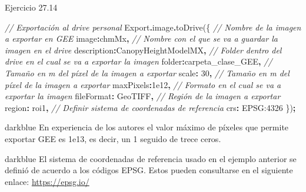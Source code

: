 \documentclass[
  12pt,
  letterpaper,
  twoside]{book}
\newenvironment{Shaded}{\begin{snugshade}}{\end{snugshade}}
\newcommand{\AttributeTok}[1]{\textcolor[rgb]{0.77,0.63,0.00}{#1}}
\newcommand{\CommentTok}[1]{\textcolor[rgb]{0.56,0.35,0.01}{\textit{#1}}}
\newcommand{\DataTypeTok}[1]{\textcolor[rgb]{0.13,0.29,0.53}{#1}}
\newcommand{\DecValTok}[1]{\textcolor[rgb]{0.00,0.00,0.81}{#1}}
\newcommand{\FloatTok}[1]{\textcolor[rgb]{0.00,0.00,0.81}{#1}}
\newcommand{\FunctionTok}[1]{\textcolor[rgb]{0.00,0.00,0.00}{#1}}
\newcommand{\NormalTok}[1]{#1}
\newcommand{\OperatorTok}[1]{\textcolor[rgb]{0.81,0.36,0.00}{\textbf{#1}}}
\newcommand{\StringTok}[1]{\textcolor[rgb]{0.31,0.60,0.02}{#1}}
\begin{document}
Ejercicio 27.14

\begin{Shaded}
\begin{Highlighting}[]
\CommentTok{// Exportación al drive personal}
\NormalTok{Export}\OperatorTok{.}\AttributeTok{image}\OperatorTok{.}\FunctionTok{toDrive}\NormalTok{(\{}
  \CommentTok{// Nombre de la imagen a exportar en GEE}
  \DataTypeTok{image}\OperatorTok{:}\NormalTok{chmMx}\OperatorTok{,} 
  \CommentTok{// Nombre con el que se va a guardar la imagen en el drive}
  \DataTypeTok{description}\OperatorTok{:}\StringTok{\textquotesingle{}CanopyHeightModelMX\textquotesingle{}}\OperatorTok{,}
  \CommentTok{// Folder dentro del drive en el cual se va a exportar la imagen}
  \DataTypeTok{folder}\OperatorTok{:}\StringTok{\textquotesingle{}carpeta\_clase\_GEE\textquotesingle{}}\OperatorTok{,}
  \CommentTok{// Tamaño en m del píxel de la imagen a exportar}
  \DataTypeTok{scale}\OperatorTok{:} \DecValTok{30}\OperatorTok{,}
  \CommentTok{// Tamaño en m del píxel de la imagen a exportar}
  \DataTypeTok{maxPixels}\OperatorTok{:}\FloatTok{1e12}\OperatorTok{,}
  \CommentTok{// Formato en el cual se va a exportar la imagen}
  \DataTypeTok{fileFormat}\OperatorTok{:} \StringTok{\textquotesingle{}GeoTIFF\textquotesingle{}}\OperatorTok{,}
  \CommentTok{// Región de la imagen a exportar}
  \DataTypeTok{region}\OperatorTok{:}\NormalTok{ roi1}\OperatorTok{,}
  \CommentTok{// Definir sistema de coordenadas de referencia}
  \DataTypeTok{crs}\OperatorTok{:} \StringTok{\textquotesingle{}EPSG:4326\textquotesingle{}}
\NormalTok{\})}\OperatorTok{;}
\end{Highlighting}
\end{Shaded}

\begin{bluebox2}

\begin{awesomeblock}{5pt}{\faLightbulb}{darkblue}
En experiencia de los autores el valor máximo de píxeles que permite exportar GEE es 1e13, es decir, un 1 seguido de trece ceros.

\end{awesomeblock}

\end{bluebox2}

\begin{bluebox2}

\begin{awesomeblock}{5pt}{\faLightbulb}{darkblue}
El sistema de coordenadas de referencia usado en el ejemplo anterior se definió de acuerdo a los códigos EPSG. Estos pueden consultarse en el siguiente enlace: \url{https://epsg.io/}

\end{awesomeblock}

\end{bluebox2}
\end{document}
